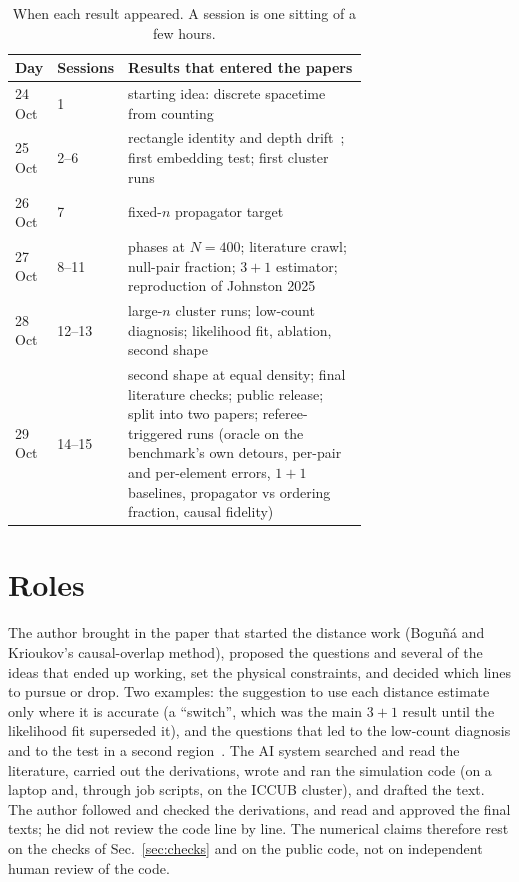 \documentclass[11pt,a4paper]{article}
\begin{document}
\begin{table}[h]
\centering\small
\begin{tabular}{@{}llp{0.7\linewidth}@{}}
\toprule
Day & Sessions & Results that entered the papers \\
\midrule
24 Oct & 1 & starting idea: discrete spacetime from counting \\
25 Oct & 2--6 & rectangle identity and depth drift~\cite{Toolkit}; first embedding test; first cluster runs \\
26 Oct & 7 & fixed-$n$ propagator target~\cite{Toolkit} \\
27 Oct & 8--11 & phases at $N=400$; literature crawl; null-pair fraction; $3+1$ estimator; reproduction of Johnston 2025~\cite{Embedding} \\
28 Oct & 12--13 & large-$n$ cluster runs; low-count diagnosis; likelihood fit, ablation, second shape~\cite{Embedding} \\
29 Oct & 14--15 & second shape at equal density; final literature checks; public release; split into two papers; referee-triggered runs (oracle on the benchmark's own detours, per-pair and per-element errors, $1+1$ baselines, propagator vs ordering fraction, causal fidelity) \\
\bottomrule
\end{tabular}
\caption{When each result appeared. A session is one sitting of a few hours.}\label{tab:timeline}
\end{table}

\section{Roles}
The author brought in the paper that started the distance work (Bogu\~n\'a and Krioukov's causal-overlap method), proposed the questions and several of the ideas that ended up working, set the physical constraints, and decided which lines to pursue or drop. Two examples: the suggestion to use each distance estimate only where it is accurate (a ``switch'', which was the main $3+1$ result until the likelihood fit superseded it), and the questions that led to the low-count diagnosis and to the test in a second region~\cite{Embedding}. The AI system searched and read the literature, carried out the derivations, wrote and ran the simulation code (on a laptop and, through job scripts, on the ICCUB cluster), and drafted the text. The author followed and checked the derivations, and read and approved the final texts; he did not review the code line by line. The numerical claims therefore rest on the checks of Sec.~\ref{sec:checks} and on the public code, not on independent human review of the code.
\end{document}
